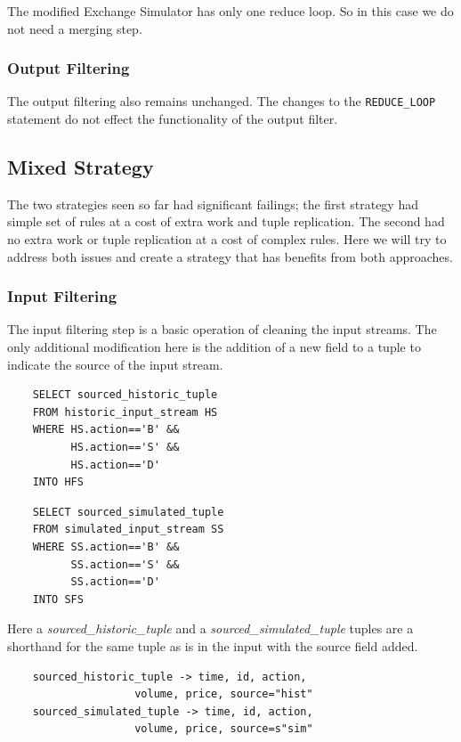 \documentclass{article}
\begin{document}
The modified Exchange Simulator has only one reduce loop. So in this case we do not need a merging step.

\subsubsection{Output Filtering}

The output filtering also remains unchanged. The changes to the {\tt REDUCE\_LOOP} statement do not effect the functionality of the output filter.  


\subsection{Mixed Strategy}

The two strategies seen so far had significant failings; the first strategy had simple set of rules at a cost of extra work and tuple replication. The second had no extra work or tuple replication at a cost of complex rules. Here we will try to address both issues and create a strategy that has benefits from both approaches. 

\subsubsection{Input Filtering}

The input filtering step is a basic operation of cleaning the input streams. The only additional modification here is the addition of a new field to a tuple to indicate the source of the input stream. 

\begin{verbatim}   
    SELECT sourced_historic_tuple 
    FROM historic_input_stream HS
    WHERE HS.action=='B' &&
          HS.action=='S' &&
          HS.action=='D'
    INTO HFS
\end{verbatim}

\begin{verbatim}  
    SELECT sourced_simulated_tuple
    FROM simulated_input_stream SS
    WHERE SS.action=='B' &&
          SS.action=='S' &&
          SS.action=='D'
    INTO SFS
\end{verbatim}

\noindent Here a \emph{sourced\_historic\_tuple} and a \emph{sourced\_simulated\_tuple} tuples are a shorthand for the same tuple as is in the input with the source field added. 

\begin{verbatim}
    sourced_historic_tuple -> time, id, action, 
                    volume, price, source="hist"
    sourced_simulated_tuple -> time, id, action, 
                    volume, price, source=s"sim"
\end{verbatim}
\end{document}
